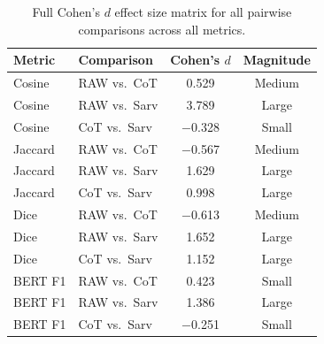 \documentclass[11pt]{article}
\begin{document}
\begin{table}[h]
\centering
\small
\begin{tabular}{@{}llcc@{}}
\toprule
\textbf{Metric} & \textbf{Comparison} & \textbf{Cohen's $d$} & \textbf{Magnitude} \\
\midrule
Cosine & RAW vs.\ CoT & 0.529 & Medium \\
Cosine & RAW vs.\ Sarv & 3.789 & Large \\
Cosine & CoT vs.\ Sarv & $-$0.328 & Small \\
Jaccard & RAW vs.\ CoT & $-$0.567 & Medium \\
Jaccard & RAW vs.\ Sarv & 1.629 & Large \\
Jaccard & CoT vs.\ Sarv & 0.998 & Large \\
Dice & RAW vs.\ CoT & $-$0.613 & Medium \\
Dice & RAW vs.\ Sarv & 1.652 & Large \\
Dice & CoT vs.\ Sarv & 1.152 & Large \\
BERT F1 & RAW vs.\ CoT & 0.423 & Small \\
BERT F1 & RAW vs.\ Sarv & 1.386 & Large \\
BERT F1 & CoT vs.\ Sarv & $-$0.251 & Small \\
\bottomrule
\end{tabular}
\caption{Full Cohen's $d$ effect size matrix for all pairwise comparisons across all metrics.}
\label{tab:effect-sizes}
\end{table}
\end{document}
